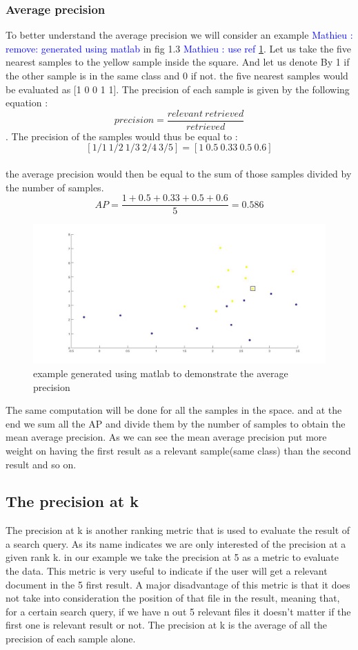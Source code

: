 \documentclass[hidelinks,12pt]{report}
\newcommand{\ml}[1]{\textcolor{blue}{ Mathieu : #1}}
\begin{document}
\subsubsection{Average precision}
To better understand the average precision we will consider an example \ml{remove: generated using matlab} in fig 1.3 \ml{use ref \ref{fig:toto}}. Let us take the five nearest samples to the yellow sample inside the square. And let us denote By 1 if the other sample is in the same class and 0 if not. the five nearest samples would be evaluated as [1 0 0 1 1]. The precision of each sample is given by the following equation : $$precision=\frac{relevant\  retrieved}{retrieved}$$. The precision of the samples would thus be equal to : $$[1/1 \  1/2 \ 1/3\  2/4\  3/5]=[1 \ 0.5 \   0.33 \ 0.5 \ 0.6]$$\\ the average precision would then be equal to the sum of those samples divided by the number of samples.$$AP=\frac{1+0.5+0.33+0.5+0.6}{5}=0.586$$
\begin{figure}[t!]
  
  \centering
	    \includegraphics[width=1\textwidth]{fig1.jpg}
    \caption{example generated using matlab to demonstrate the average precision}
    \label{fig:toto}
\end{figure}
The same computation will be done for all the samples in the space. and at the end we sum all the AP and divide them by the number of samples to obtain the mean average precision. As we can see the mean average precision put more weight on having the first result as a relevant sample(same class) than the second result and so on.
\subsection{The precision at k}
The precision at k is another ranking metric that is used to evaluate the result of a search query. As  its name indicates we are only interested of the precision at a given rank k. in our example we take the precision at 5 as a metric to evaluate the data. This metric is very useful to indicate if the user will get a relevant document in the 5 first result. A major disadvantage of this metric is that it does not take into consideration the position of that file in the result, meaning that, for a certain search query, if we have n out 5 relevant files it doesn't matter if the first one is relevant result or not. The precision at k is the average of all the precision of each sample alone.
\end{document}
